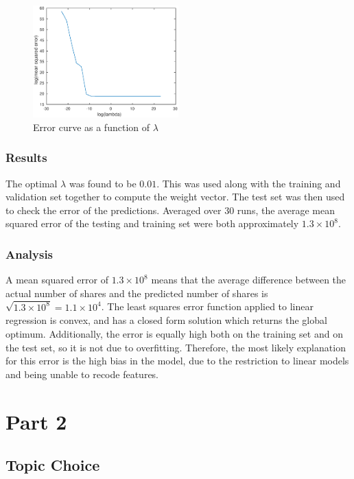 \documentclass[10pt,twocolumn]{article}
\begin{document}
\begin{figure}[htpb]
	\centering
	\includegraphics[width=0.5\textwidth]{part1-error-curve}
	\caption{Error curve as a function of $\lambda$}
	\label{fig:ecurve1-lambda}
\end{figure}

\subsubsection{Results}

The optimal $\lambda$ was found to be $0.01$.
This was used along with the training and validation set together to compute the weight vector.
The test set was then used to check the error of the predictions.
Averaged over $30$ runs, the average mean squared error of the testing and training set were both approximately $1.3\times 10^8$.

\subsubsection{Analysis}

A mean squared error of $1.3\times 10^8$ means that the average difference between the actual number of shares and the predicted number of shares is $\sqrt{1.3\times 10^8} = 1.1\times 10^4$.
The least squares error function applied to linear regression is convex, and has a closed form solution which returns the global optimum.
Additionally, the error is equally high both on the training set and on the test set, so it is not due to overfitting.
Therefore, the most likely explanation for this error is the high bias in the model, due to the restriction to linear models and being unable to recode features.

\section{Part 2}

\subsection{Topic Choice}
\end{document}
